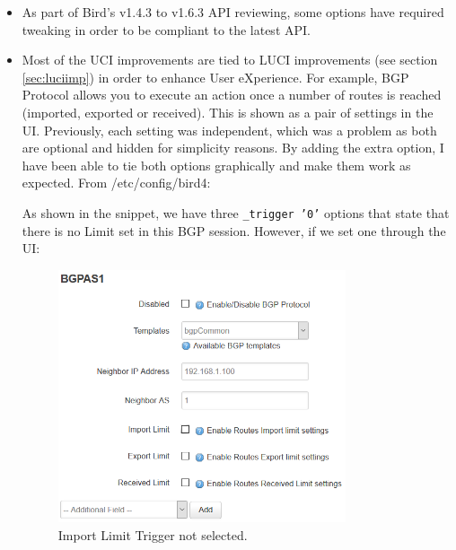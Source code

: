 \begin{itemize}
    \item As part of Bird's v1.4.3 to v1.6.3 API reviewing, some options have required tweaking in order to be compliant to the latest API.
    \item Most of the UCI improvements are tied to LUCI improvements (see section \ref{sec:luciimp}) in order to enhance User eXperience.
    For example, BGP Protocol allows you to execute an action once a number of routes is reached (imported, exported or received). This is shown as a pair of settings in the UI. Previously, each setting was independent, which was a problem as both are optional and hidden for simplicity reasons.
    By adding the extra option, I have been able to tie both options graphically and make them work as expected.
    From /etc/config/bird4:
    
    As shown in the snippet, we have three \texttt{\_trigger '0'} options that state that there is no Limit set in this BGP session. However, if we set one through the UI:
    
\begin{figure}[H]
    \centering
    \includegraphics[width=0.8\textwidth]{images/bgp/bgptrigger1}
    \caption{Import Limit Trigger not selected.}
    \label{fig:uitiedn}
\end{figure}


\end{itemize}
